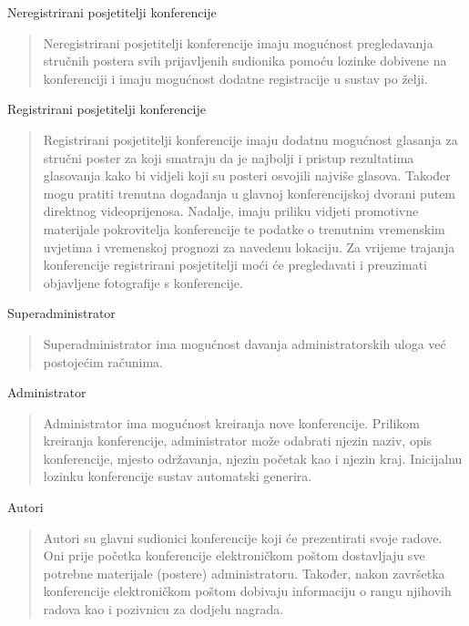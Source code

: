 			\begin{packed_enum}
				\item Neregistrirani posjetitelji konferencije

			\begin{quote}
				Neregistrirani posjetitelji konferencije imaju mogućnost pregledavanja stručnih postera svih prijavljenih sudionika pomoću lozinke dobivene na konferenciji i imaju mogućnost dodatne registracije u sustav po želji.
			\end{quote}

				\item Registrirani posjetitelji konferencije

		\begin{quote}
			Registrirani posjetitelji konferencije imaju dodatnu mogućnost glasanja za stručni poster za koji smatraju da je najbolji i pristup rezultatima glasovanja kako bi vidjeli koji su posteri osvojili najviše glasova. Također mogu pratiti trenutna događanja u glavnoj konferencijskoj dvorani putem direktnog videoprijenosa. Nadalje, imaju priliku vidjeti promotivne materijale pokrovitelja konferencije te podatke o trenutnim vremenskim uvjetima i vremenskoj prognozi za navedenu lokaciju. Za vrijeme trajanja konferencije registrirani posjetitelji moći će pregledavati i preuzimati objavljene fotografije s konferencije.
		\end{quote}

				\item Superadministrator
				\begin{quote}
					Superadministrator ima mogućnost davanja administratorskih uloga već postojećim računima.
				\end{quote}

				\item Administrator
				\begin{quote}
					Administrator ima mogućnost kreiranja nove konferencije. Prilikom kreiranja konferencije, administrator može odabrati njezin naziv, opis konferencije, mjesto održavanja, njezin početak kao i njezin kraj. Inicijalnu lozinku konferencije sustav automatski generira.
				\end{quote}

				\item Autori
				\begin{quote}
					Autori su glavni sudionici konferencije koji će prezentirati svoje radove. Oni prije početka konferencije elektroničkom poštom dostavljaju sve potrebne materijale (postere) administratoru. Također, nakon završetka konferencije elektroničkom poštom dobivaju informaciju o rangu njihovih radova kao i pozivnicu za dodjelu nagrada.
				\end{quote}


\end{packed_enum}
